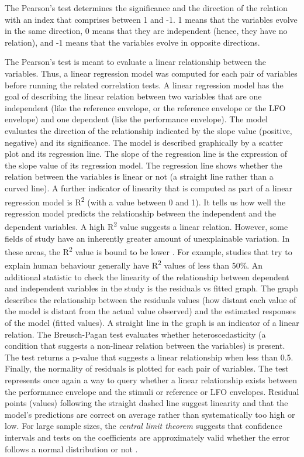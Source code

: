 \documentclass[sigconf]{nimeart}
\begin{document}
The Pearson's test determines the significance and the direction of the relation with an index that comprises between 1 and -1. 1 means that the variables evolve in the same direction, 0 means that they are independent (hence, they have no relation), and -1 means that the variables evolve in opposite directions.

The Pearson's test is meant to evaluate a linear relationship between the variables. Thus, a linear regression model was computed for each pair of variables before running the related correlation tests. A linear regression model has the goal of describing the linear relation between two variables that are one independent (like the reference envelope, or the reference envelope or the LFO envelope) and one dependent (like the performance envelope). The model evaluates the direction of the relationship indicated by the slope value (positive, negative) and its significance. The model is described graphically by a scatter plot and its regression line. The slope of the regression line is the expression of the slope value of its regression model. The regression line shows whether the relation between the variables is linear or not (a straight line rather than a curved line). A further indicator of linearity that is computed as part of a linear regression model is R\textsuperscript{2} (with a value between 0 and 1). It tells us how well the regression model predicts the relationship between the independent and the dependent variables. A high R\textsuperscript{2} value suggests a linear relation. However, some fields of study have an inherently greater amount of unexplainable variation. In these areas, the R\textsuperscript{2} value is bound to be lower \cite{funder2019evaluating}. For example, studies that try to explain human behaviour generally have R\textsuperscript{2} values of less than 50\%. An additional statistic to check the linearity of the relationship between dependent and independent variables in the study is the residuals vs fitted graph. The graph describes the relationship between the residuals values (how distant each value of the model is distant from the actual value observed) and the estimated responses of the model (fitted values). A straight line in the graph is an indicator of a linear relation. The Breusch-Pagan test evaluates whether heteroscedasticity (a condition that suggests a non-linear relation between the variables) is present. The test returns a p-value that suggests a linear relationship when less than 0.5. Finally, the normality of residuals is plotted for each pair of variables. The test represents once again a way to query whether a linear relationship exists between the performance envelope and the stimuli or reference or LFO envelopes. Residual points (values) following the straight dashed line suggest linearity and that the model's predictions are correct on average rather than systematically too high or low. For large sample sizes, the \emph{central limit theorem} suggests that confidence intervals and tests on the coefficients are approximately valid whether the error follows a normal distribution or not \cite{ernst2017regression,lumley2002importance}.
\end{document}
